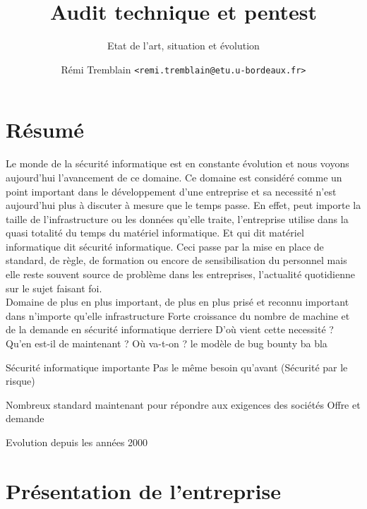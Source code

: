 \documentclass[a4paper]{memoir}
\title{Audit technique et pentest}
\subtitle{Etat de l'art, situation et évolution}
\author{Rémi Tremblain \texttt{<remi.tremblain@etu.u-bordeaux.fr>}}
\begin{document}
\frontmatter%
\maketitle
\thispagestyle{empty}





\chapter*{Résumé}


Le monde de la sécurité informatique est en constante évolution et nous voyons aujourd'hui l'avancement de ce domaine.
Ce domaine est considéré comme un point important dans le développement d'une entreprise et sa necessité n'est aujourd'hui plus à discuter à mesure que le temps passe. En effet, peut importe la taille de l'infrastructure ou les données qu'elle traite, l'entreprise utilise dans la quasi totalité du temps du matériel informatique. Et qui dit matériel informatique dit sécurité informatique. Ceci passe par la mise en place de standard, de règle, de formation ou encore de sensibilisation du personnel mais elle reste souvent source de problème dans les entreprises, l'actualité quotidienne sur le sujet faisant foi.\\


Domaine de plus en plus important, de plus en plus prisé et reconnu
important dans n'importe qu'elle infrastructure 
Forte croissance du nombre de machine et de la demande en sécurité informatique derriere 
D'où vient cette necessité ? Qu'en est-il de maintenant ? Où va-t-on ? le modèle de bug bounty ba bla

Sécurité informatique importante
Pas le même besoin qu'avant (Sécurité par le risque)

Nombreux standard maintenant pour répondre aux exigences des sociétés
Offre et demande

Evolution depuis les années 2000


\chapter*{Présentation de l'entreprise}
\end{document}
